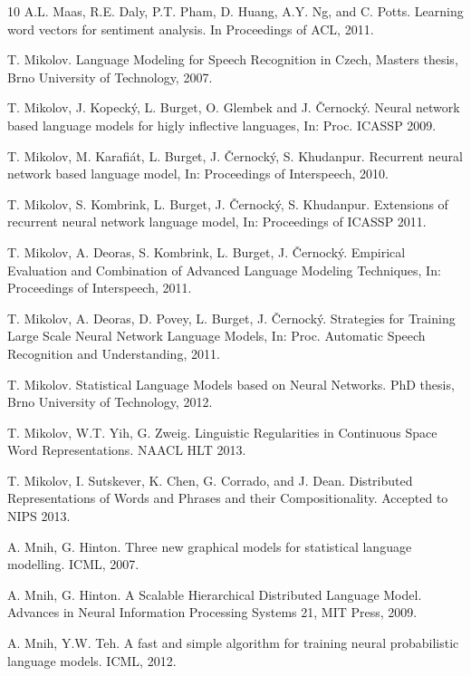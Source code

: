 \documentclass{article} %
\begin{document}
\begin{thebibliography}{10}
 A.L. Maas, R.E. Daly, P.T. Pham, D. Huang, A.Y. Ng, and C. Potts. Learning word vectors for sentiment analysis. In Proceedings of ACL, 2011.

 T. Mikolov. Language Modeling for Speech Recognition in Czech, Masters thesis, Brno University of Technology, 2007.

 T. Mikolov, J. Kopeck\'{y}, L. Burget, O. Glembek and J. \v{C}ernock\'{y}. Neural
network based language models for higly inflective
languages, In: Proc. ICASSP 2009.

 T. Mikolov, M. Karafi\'{a}t, L. Burget, J. \v{C}ernock\'{y}, S. Khudanpur. Recurrent
neural network based language model, In: Proceedings of Interspeech, 2010.

 T. Mikolov, S. Kombrink, L. Burget, J. \v{C}ernock\'{y}, S. Khudanpur. Extensions
of recurrent neural network language model, In: Proceedings of ICASSP 2011.

 T. Mikolov, A. Deoras, S. Kombrink, L. Burget, J. \v{C}ernock\'{y}.
Empirical Evaluation and Combination of Advanced Language Modeling Techniques, In: Proceedings of Interspeech, 2011.

 T. Mikolov, A. Deoras, D. Povey, L. Burget, J. \v{C}ernock\'{y}. Strategies for Training Large Scale Neural Network Language Models,
In: Proc. Automatic Speech Recognition and Understanding, 2011.

 T. Mikolov. Statistical Language Models based on Neural Networks. PhD thesis, Brno University of Technology, 2012.

 T. Mikolov, W.T. Yih, G. Zweig. Linguistic Regularities in Continuous Space Word Representations.
NAACL HLT 2013.

 T. Mikolov, I. Sutskever, K. Chen, G. Corrado, and J. Dean. Distributed Representations of Words and Phrases and their Compositionality. Accepted to NIPS 2013.

 A. Mnih, G. Hinton. Three new graphical models for statistical language modelling. ICML, 2007.

 A. Mnih, G. Hinton. A Scalable Hierarchical Distributed Language Model. Advances in Neural Information Processing Systems 21, MIT Press, 2009.

 A. Mnih, Y.W. Teh. A fast and simple algorithm for training neural probabilistic language models. ICML, 2012.


\end{thebibliography}
\end{document}
